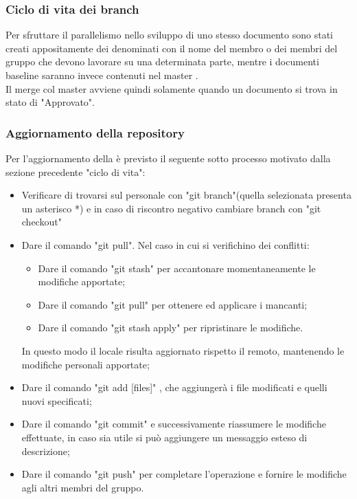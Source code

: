 \documentclass[NormeDiProgetto.tex]{subfiles}
\begin{document}
	\subsubsection{Ciclo di vita dei branch}
	Per sfruttare il parallelismo nello sviluppo di uno stesso documento sono stati creati appositamente dei  denominati con il nome del membro o dei membri del gruppo che devono lavorare su una determinata parte, mentre i documenti baseline saranno invece contenuti nel master .\\
	Il merge col master avviene quindi solamente quando un documento si trova in stato di "Approvato".
	
	\subsubsection{Aggiornamento della repository}
	Per l'aggiornamento della  è previsto il seguente sotto processo motivato dalla sezione precedente "ciclo di vita":
	\begin{itemize}
		\item Verificare di trovarsi sul  personale con "git branch"(quella selezionata presenta un asterisco *) e in caso di riscontro negativo cambiare branch con "git checkout"
		\item Dare il comando "git pull". Nel caso in cui si verifichino dei conflitti:
		\begin{itemize}
			\item Dare il comando "git stash" per accantonare momentaneamente	le modifiche apportate;
			\item Dare il comando "git pull" per ottenere ed applicare i  mancanti;
			\item Dare il comando "git stash apply" per ripristinare le modifiche.
		\end{itemize}
		In questo modo il  locale risulta aggiornato rispetto il  remoto, mantenendo le modifiche personali apportate;
	
		\item Dare il comando "git add [files]" , che aggiungerà i file modificati e quelli nuovi specificati;
		\item Dare il comando "git commit" e successivamente riassumere le modifiche effettuate, in caso sia utile si può aggiungere un messaggio esteso di descrizione;
		\item Dare il comando "git push" per completare l'operazione e fornire le modifiche agli altri membri del gruppo.
	\end{itemize}
	
\end{document}
